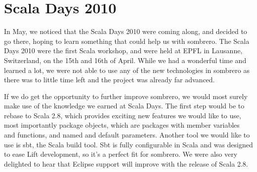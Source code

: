 \section{Scala Days 2010}

In May, we noticed that the Scala Days 2010 were coming along, and decided to go there, hoping to learn something that could help us with sombrero. The Scala Days 2010 were the first Scala workshop, and were held at EPFL in Lausanne, Switzerland, on the 15th and 16th of April. While we had a wonderful time and learned a lot, we were not able to use any of the new technologies in sombrero as there was to little time left and the project was already far advanced.

If we do get the opportunity to further improve sombrero, we would most surely make use of the knowledge we earned at Scala Days. The first step would be to rebase to Scala 2.8, which provides exciting new features we would like to use, most importantly package objects, which are packages with member variables and functions, and named and default parameters. Another tool we would like to use is sbt, the Scala build tool. Sbt is fully configurable in Scala and was designed to ease Lift development, so it's a perfect fit for sombrero. We were also very delighted to hear that Eclipse support will improve with the release of Scala 2.8.
